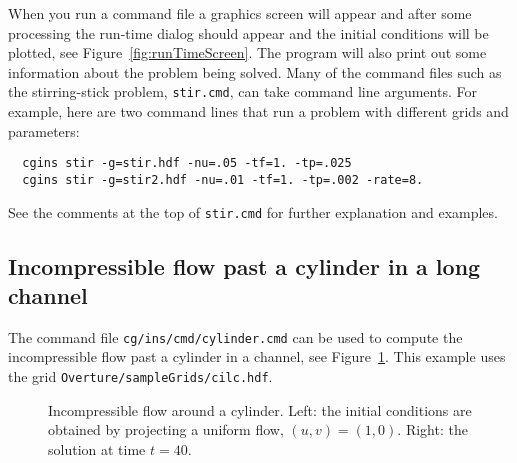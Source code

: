 \documentclass{article}
\begin{document}
When you run a command file a graphics screen will appear and after some
processing the run-time dialog should appear and the initial conditions will be
plotted, see Figure~\ref{fig:runTimeScreen}. The program will also print out some information about the problem
being solved. 
Many of the command files such as the stirring-stick problem, {\tt stir.cmd},
can take command line arguments.  For example, here
are two command lines that run a problem with different grids and parameters:
\begin{verbatim}
  cgins stir -g=stir.hdf -nu=.05 -tf=1. -tp=.025 
  cgins stir -g=stir2.hdf -nu=.01 -tf=1. -tp=.002 -rate=8.
\end{verbatim}
See the comments at the top of {\tt stir.cmd} for further explanation and examples.

\subsection{Incompressible flow past a cylinder in a long channel}

The command file {\tt cg/ins/cmd/cylinder.cmd} can be used
to compute the incompressible flow past a cylinder in a channel, see Figure~\ref{fig:cylinder}.
This example uses the grid {\tt Overture/\-sampleGrids/cilc.hdf}.

{
\begin{figure}[hbt]
\newcommand{\figWidtha}{7.5cm}
\newcommand{\trimfiga}[2]{\trimPlotb{#1}{#2}{.0}{.0}{.1}{.0}}
\begin{center}
\end{center} 
\caption{Incompressible flow around a cylinder. Left: the initial conditions are obtained by
    projecting a uniform flow, $(u,v)=(1,0)$. Right: the solution at time $t=40$.}
  \label{fig:cylinder}
\end{figure}
}
\end{document}
